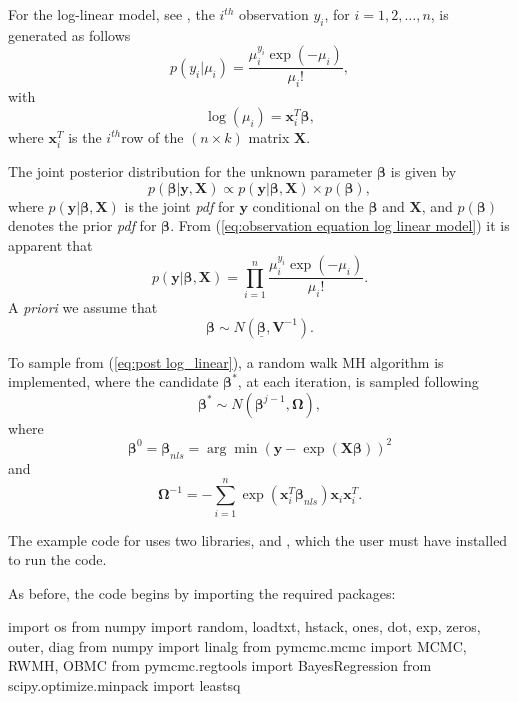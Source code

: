 \documentclass[article]{jss}
\begin{document}
For the log-linear model, see \citet{GelmanCarlinSternRubin2004}, the
$i^{th}$ observation $y_{i}$, for $i=1,2,\dots,n$, is generated as
follows
\begin{equation}
  p(y_{i}|\mu_{i})=\frac{\mu_{i}^{y_{i}}\exp(-\mu_{i})}{\mu_{i}!},\label{eq:observation
    equation log linear model}
\end{equation} with \[
\log(\mu_{i})=\bm{x}_{i}^{T}\bm{\beta},\] where $\bm{x}_{i}^{T}$ is
the $i^{th}$row of the $\left(n\times k\right)$ matrix $\bm{X}.$

The joint posterior distribution for the unknown parameter
$\bm{\beta}$ is given by
\begin{equation}
  p(\bm{\beta}|\bm{y},\bm{X})\propto p(\bm{y}|\bm{\beta},\bm{X})\times
  p(\bm{\beta}),
\label{eq:post log_linear}
\end{equation} 
where $p(\bm{y}|\bm{\beta},\bm{X})$ is the joint \emph{pdf }for
$\bm{y}$ conditional on the $\bm{\beta}$ and $\bm{X}$, and
$p(\bm{\beta})$ denotes the prior \emph{pdf }for $\bm{\beta}.$ From
(\ref{eq:observation equation log linear model}) it is apparent that\[
p(\bm{y}|\bm{\beta},\bm{X})=\prod_{i=1}^{n}\frac{\mu_{i}^{y_{i}}\exp(-\mu_{i})}{\mu_{i}!}.\]
A \emph{priori }we assume that \[ \bm{\beta}\sim
N(\bm{\underline{\bm{\beta}}},\bm{V}^{-1}).\]

To sample from (\ref{eq:post log_linear}), a random walk MH algorithm
is implemented, where the candidate $\bm{\beta}^{*}$, at each
iteration, is sampled following \begin{equation} \bm{\beta}^{*}\sim
  N\left(\bm{\beta}^{j-1},\bm{\Omega}\right),\label{eq:candidate
    log-linear}\end{equation} where\[
\bm{\beta}^{0}=\bm{\beta}_{nls}=\arg\min\left(\bm{y}-\exp\left(\bm{X}\bm{\beta}\right)\right)^{2}\]
and\[
\bm{\Omega}^{-1}=-\sum_{i=1}^{n}\exp\left(\bm{x}_{i}^{T}\bm{\beta}_{nls}\right)\bm{x}_{i}\bm{x}_{i}^{T}.\]


The example code for  uses two 
libraries,  and , which the user must have
installed to run the code.  

As before, the code begins by importing the required packages:

\begin{Code}
import os
from numpy import random, loadtxt, hstack, ones, dot, exp, zeros, outer, diag
from numpy import linalg
from pymcmc.mcmc import MCMC, RWMH, OBMC
from pymcmc.regtools import BayesRegression
from scipy.optimize.minpack import leastsq
\end{Code}
\end{document}
